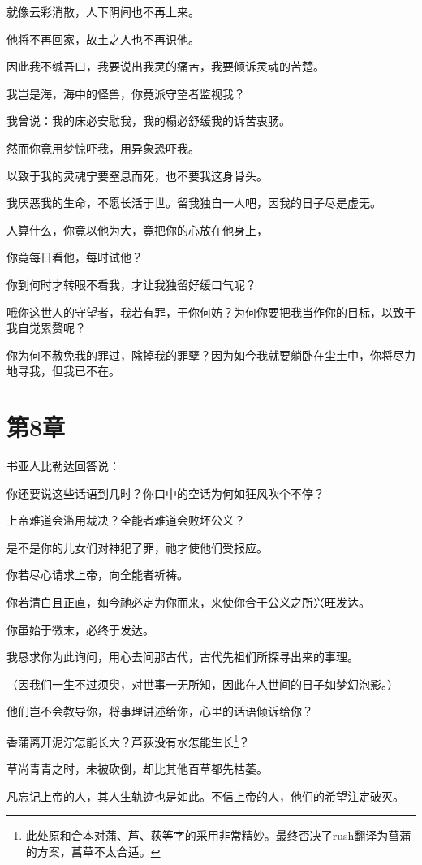 \documentclass[12pt,oneside]{book}
\begin{document}
就像云彩消散，人下阴间也不再上来。

他将不再回家，故土之人也不再识他。

因此我不缄吾口，我要说出我灵的痛苦，我要倾诉灵魂的苦楚。

我岂是海，海中的怪兽，你竟派守望者监视我？

我曾说：我的床必安慰我，我的榻必舒缓我的诉苦衷肠。

然而你竟用梦惊吓我，用异象恐吓我。

以致于我的灵魂宁要窒息而死，也不要我这身骨头。

我厌恶我的生命，不愿长活于世。留我独自一人吧，因我的日子尽是虚无。

人算什么，你竟以他为大，竟把你的心放在他身上，

你竟每日看他，每时试他？

你到何时才转眼不看我，才让我独留好缓口气呢？

哦你这世人的守望者，我若有罪，于你何妨？为何你要把我当作你的目标，以致于我自觉累赘呢？

你为何不赦免我的罪过，除掉我的罪孽？因为如今我就要躺卧在尘土中，你将尽力地寻我，但我已不在。


\chapter{第8章}
书亚人比勒达回答说：

你还要说这些话语到几时？你口中的空话为何如狂风吹个不停？

上帝难道会滥用裁决？全能者难道会败坏公义？

是不是你的儿女们对神犯了罪，祂才使他们受报应。

你若尽心请求上帝，向全能者祈祷。

你若清白且正直，如今祂必定为你而来，来使你合于公义之所兴旺发达。

你虽始于微末，必终于发达。

我恳求你为此询问，用心去问那古代，古代先祖们所探寻出来的事理。

（因我们一生不过须臾，对世事一无所知，因此在人世间的日子如梦幻泡影。）

他们岂不会教导你，将事理讲述给你，心里的话语倾诉给你？

香蒲离开泥泞怎能长大？芦荻没有水怎能生长\footnote{此处原和合本对蒲、芦、荻等字的采用非常精妙。最终否决了rush翻译为菖蒲的方案，菖草不太合适。}？

草尚青青之时，未被砍倒，却比其他百草都先枯萎。

凡忘记上帝的人，其人生轨迹也是如此。不信上帝的人，他们的希望注定破灭。
\end{document}
